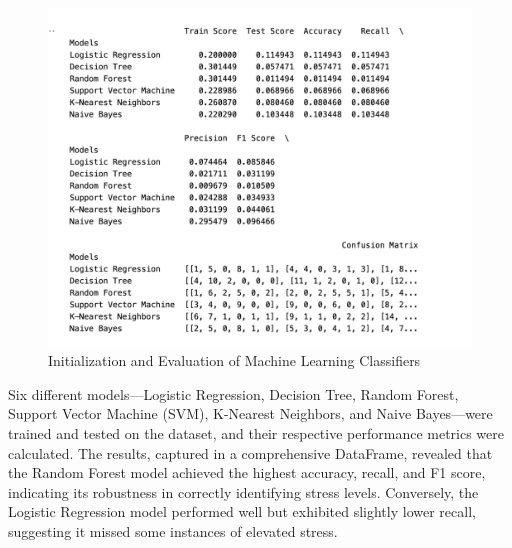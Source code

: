 \documentclass[runningheads]{llncs}
\begin{document}
\begin{enumerate}
\newpage
\begin{figure}
    \centering
    \includegraphics[width=1.0\linewidth]{modeling 9.png}
    \caption{Initialization and Evaluation of Machine Learning Classifiers} 
    \label{fig:enter-label}
\end{figure}

Six different models—Logistic Regression, Decision Tree, Random Forest, Support Vector Machine (SVM), K-Nearest Neighbors, and Naive Bayes—were trained and tested on the dataset, and their respective performance metrics were calculated. The results, captured in a comprehensive DataFrame, revealed that the Random Forest model achieved the highest accuracy, recall, and F1 score, indicating its robustness in correctly identifying stress levels. Conversely, the Logistic Regression model performed well but exhibited slightly lower recall, suggesting it missed some instances of elevated stress. 


\end{enumerate}
\end{document}
